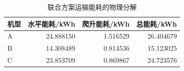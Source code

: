 \begin{table}[htbp]\centering\small
\caption{联合方案运输能耗的物理分解}\label{tab:rev_q3_transport_energy}
\begin{tabular}{lrrr}\toprule
机型 & 水平能耗/kWh & 爬升能耗/kWh & 总能耗/kWh\\\midrule
A & 24.888150 & 1.516529 & 26.404679\\
B & 14.308489 & 0.814536 & 15.123025\\
C & 23.853709 & 0.869867 & 24.723576\\
\bottomrule\end{tabular}
\end{table}
